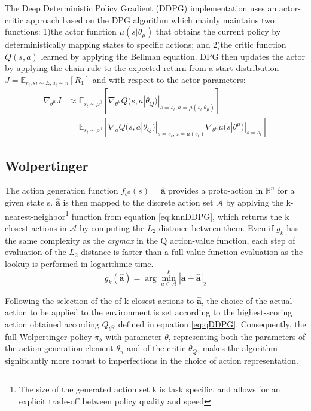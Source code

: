 The Deep Deterministic Policy Gradient (DDPG) implementation uses an actor-critic approach based on the DPG algorithm which mainly maintains two functions: 1)the actor function $\mu(s|\theta_{\mu})$ that obtains the current policy by deterministically mapping states to specific actions; and 2)the critic function $Q(s,a)$ learned by applying the Bellman equation. DPG then updates the actor by applying the chain rule to the expected return from a start distribution $J = \mathbb{E}_{r_i, si \sim E, a_i \sim \pi}[R_1]$ and with respect to the actor parameters:
\begin{equation}
\label{}
\begin{aligned}
\nabla_{\theta^{\mu}}J & \approx \mathbb{E}_{s_t \sim \rho^{\beta}} [\nabla_{\theta^{\mu}} Q(s, a | \theta_Q)|_{s=s_t, a=\mu(s_t|\theta_{\mu})} ] \\
& = \mathbb{E}_{s_t \sim \rho^{\beta}} [\nabla_a Q(s, a | \theta_Q)|_{s=s_t, a=\mu(s_t)}  \nabla_{\theta^{\mu}} \mu(s|\theta^{\mu})|_{s=s_t}]
\end{aligned}
\end{equation}

\subsection{Wolpertinger}

The action generation function $f_{\theta^{\pi}}(s) = \hat{\mathbf{a}}$ provides a proto-action in $\mathbb{R}^n$ for a given state s. $\hat{\mathbf{a}}$ is then mapped to the discrete action set $\mathcal{A}$ by applying the k-nearest-neighbor\footnote{The size of the generated action set k is task specific, and allows for an explicit trade-off between policy quality and speed} function from equation \ref{eq:knnDDPG}, which returns the k closest actions in $\mathcal{A}$ by computing the $L_2$ distance between them. Even if $g_k$ has the same complexity as the \textit{argmax} in the Q action-value function, each step of evaluation of the $L_2$ distance is faster than a full value-function evaluation as the lookup is performed in logarithmic time.
\begin{equation}
\label{eq:knnDDPG}
g_k(\hat{\mathbf{a}}) = \arg\min^k_{a \in \mathcal{A}} | \mathbf{a} - \mathbf{\hat{\mathbf{a}}} |_2
\end{equation}

Following the selection of the of k closest actions to $\hat{\mathbf{a}}$, the choice of the actual action to be applied to the environment is set according to the highest-scoring action obtained according $Q_{\theta^Q}$ defined in equation \ref{eq:qDDPG}. Consequently, the full Wolpertinger policy $\pi_{\theta}$ with parameter $\theta$, representing both the parameters of the action generation element $\theta_{\pi}$ and of the critic $\theta_Q$, makes the algorithm significantly more robust to imperfections in the choice of action representation.

